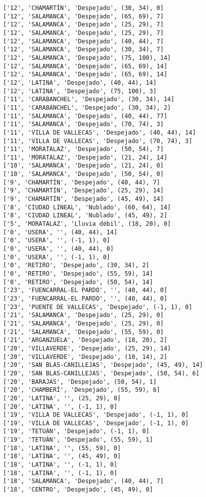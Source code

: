 \documentclass[11pt]{article}
\begin{document}
\begin{Verbatim}[commandchars=\\\{\}]
['12', 'CHAMARTÍN', 'Despejado', (30, 34), 0]
['12', 'SALAMANCA', 'Despejado', (65, 69), 7]
['12', 'SALAMANCA', 'Despejado', (25, 29), 7]
['12', 'SALAMANCA', 'Despejado', (25, 29), 7]
['12', 'SALAMANCA', 'Despejado', (40, 44), 7]
['12', 'SALAMANCA', 'Despejado', (30, 34), 7]
['12', 'SALAMANCA', 'Despejado', (75, 100), 14]
['12', 'SALAMANCA', 'Despejado', (65, 69), 14]
['12', 'SALAMANCA', 'Despejado', (65, 69), 14]
['12', 'LATINA', 'Despejado', (40, 44), 14]
['12', 'LATINA', 'Despejado', (75, 100), 3]
['11', 'CARABANCHEL', 'Despejado', (30, 34), 14]
['11', 'CARABANCHEL', 'Despejado', (30, 34), 2]
['11', 'SALAMANCA', 'Despejado', (40, 44), 77]
['11', 'SALAMANCA', 'Despejado', (70, 74), 3]
['11', 'VILLA DE VALLECAS', 'Despejado', (40, 44), 14]
['11', 'VILLA DE VALLECAS', 'Despejado', (70, 74), 3]
['11', 'MORATALAZ', 'Despejado', (50, 54), 7]
['11', 'MORATALAZ', 'Despejado', (21, 24), 14]
['10', 'SALAMANCA', 'Despejado', (21, 24), 0]
['10', 'SALAMANCA', 'Despejado', (50, 54), 0]
['9', 'CHAMARTÍN', 'Despejado', (40, 44), 7]
['9', 'CHAMARTÍN', 'Despejado', (25, 29), 14]
['9', 'CHAMARTÍN', 'Despejado', (45, 49), 14]
['8', 'CIUDAD LINEAL', 'Nublado', (60, 64), 14]
['8', 'CIUDAD LINEAL', 'Nublado', (45, 49), 2]
['5', 'MORATALAZ', 'Lluvia débil', (18, 20), 0]
['0', 'USERA', '', (40, 44), 14]
['0', 'USERA', '', (-1, 1), 0]
['0', 'USERA', '', (40, 44), 0]
['0', 'USERA', '', (-1, 1), 0]
['0', 'RETIRO', 'Despejado', (30, 34), 2]
['0', 'RETIRO', 'Despejado', (55, 59), 14]
['0', 'RETIRO', 'Despejado', (50, 54), 14]
['23', 'FUENCARRAL-EL PARDO', '', (40, 44), 0]
['23', 'FUENCARRAL-EL PARDO', '', (40, 44), 0]
['23', 'PUENTE DE VALLECAS', 'Despejado', (-1, 1), 0]
['21', 'SALAMANCA', 'Despejado', (25, 29), 0]
['21', 'SALAMANCA', 'Despejado', (25, 29), 0]
['21', 'SALAMANCA', 'Despejado', (55, 59), 0]
['21', 'ARGANZUELA', 'Despejado', (18, 20), 2]
['20', 'VILLAVERDE', 'Despejado', (25, 29), 14]
['20', 'VILLAVERDE', 'Despejado', (10, 14), 2]
['20', 'SAN BLAS-CANILLEJAS', 'Despejado', (45, 49), 14]
['20', 'SAN BLAS-CANILLEJAS', 'Despejado', (50, 54), 6]
['20', 'BARAJAS', 'Despejado', (50, 54), 1]
['20', 'CHAMBERÍ', 'Despejado', (55, 59), 6]
['20', 'LATINA', '', (25, 29), 0]
['20', 'LATINA', '', (-1, 1), 0]
['19', 'VILLA DE VALLECAS', 'Despejado', (-1, 1), 0]
['19', 'VILLA DE VALLECAS', 'Despejado', (-1, 1), 0]
['19', 'TETUÁN', 'Despejado', (-1, 1), 0]
['19', 'TETUÁN', 'Despejado', (55, 59), 1]
['18', 'LATINA', '', (55, 59), 0]
['18', 'LATINA', '', (45, 49), 0]
['18', 'LATINA', '', (-1, 1), 0]
['18', 'LATINA', '', (-1, 1), 0]
['18', 'SALAMANCA', 'Despejado', (40, 44), 7]
['18', 'CENTRO', 'Despejado', (45, 49), 0]

\end{Verbatim}
\end{document}
